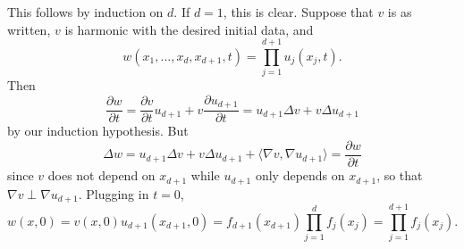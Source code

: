 \documentclass[10pt]{article}
\theoremstyle{definition}
\begin{document}
This follows by induction on $d$. If $d = 1$, this is clear.
Suppose that $v$ is as written, $v$ is harmonic with the desired initial data, and
$$w(x_1, \dots, x_d, x_{d+1}, t) = \prod_{j=1}^{d+1} u_j(x_j, t).$$
Then
$$\frac{\partial w}{\partial t} = \frac{\partial v}{\partial t}u_{d+1} + v\frac{\partial u_{d+1}}{\partial t} = u_{d+1}\Delta v + v\Delta u_{d+1}$$
by our induction hypothesis.
But
$$\Delta w = u_{d+1} \Delta v + v \Delta u_{d+1} + \langle \nabla v, \nabla u_{d+1}\rangle = \frac{\partial w}{\partial t}$$
since $v$ does not depend on $x_{d+1}$ while $u_{d+1}$ only depends on $x_{d+1}$, so that $\nabla v \perp \nabla u_{d+1}$.
Plugging in $t = 0$,
$$w(x, 0) = v(x, 0) u_{d+1}(x_{d+1}, 0) = f_{d+1}(x_{d+1})\prod_{j=1}^d f_j(x_j) = \prod_{j=1}^{d+1} f_j(x_j).$$
\end{document}

